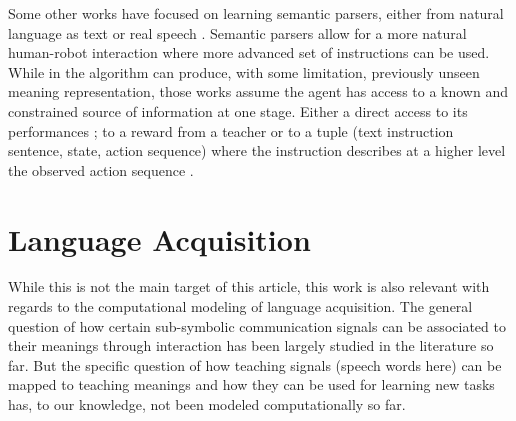 Some other works have focused on learning semantic parsers, either from natural language as text \cite{branavan2011learning,kim2012unsupervised} or real speech \cite{doshi2008spoken}. Semantic parsers allow for a more natural human-robot interaction where more advanced set of instructions can be used. While in \cite{kim2012unsupervised} the algorithm can produce, with some limitation, previously unseen meaning representation, those works assume the agent has access to a known and constrained source of information at one stage. Either a direct access to its performances \cite{branavan2011learning}; to a reward from a teacher \cite{doshi2008spoken} or to a tuple (text instruction sentence, state, action sequence) where the instruction describes at a higher level the observed action sequence \cite{kim2012unsupervised}.

\section{Language Acquisition}

While this is not the main target of this article, this work is also relevant with regards to the computational modeling of language acquisition. The general question of how certain sub-symbolic communication signals can be associated to their meanings through interaction has been largely studied in the literature so far. But the specific question of how teaching signals (speech words here) can be mapped to teaching meanings and how they can be used for learning new tasks has, to our knowledge, not been modeled computationally so far. 

